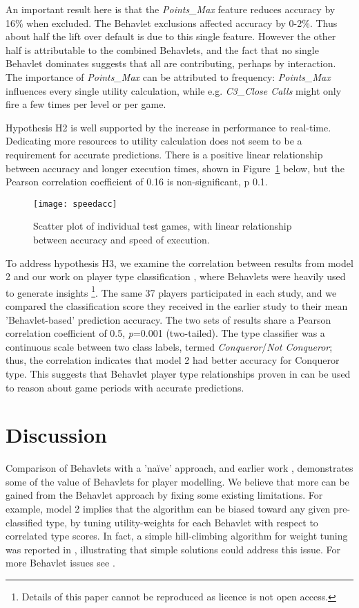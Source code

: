 \documentclass[conference]{IEEEtran}
\begin{document}
An important result here is that the \textit{Points\_Max} feature reduces accuracy by 16\% when excluded. The Behavlet exclusions affected accuracy by 0-2\%. Thus about half the lift over default is due to this single feature. However the other half is attributable to the combined Behavlets, and the fact that no single Behavlet dominates suggests that all are contributing, perhaps by interaction. The importance of \textit{Points\_Max} can be attributed to frequency: \textit{Points\_Max} influences every single utility calculation, while e.g. \textit{C3\_Close Calls} might only fire a few times per level or per game.

Hypothesis \textsf{H2} is well supported by the increase in performance to real-time. Dedicating more resources to utility calculation does not seem to be a requirement for accurate predictions. There is a positive linear relationship between accuracy and longer execution times, shown in Figure~\ref{fig.speedacc} below, but the Pearson correlation coefficient of 0.16 is non-significant, p  0.1.


\begin{figure}[!ht]
	\centering
	\texttt{[image: speedacc]}
	\caption{Scatter plot of individual test games, with linear relationship between accuracy and speed of execution.}
	\label{fig.speedacc}
\end{figure}

To address hypothesis \textsf{H3}, we examine the correlation between results from model 2 and our work on player type classification \cite{Cowley2013}, where Behavlets were heavily used to generate insights \footnote{Details of this paper cannot be reproduced as licence is not open access.}. The same 37 players participated in each study, and we compared the classification score they received in the earlier study to their mean 'Behavlet-based' prediction accuracy. The two sets of results share a Pearson correlation coefficient of 0.5, \textit{p}=0.001 (two-tailed). The type classifier was a continuous scale between two class labels, termed \textit{Conqueror}/\textit{Not Conqueror}; thus, the correlation indicates that model 2 had better accuracy for Conqueror type. This suggests that Behavlet player type relationships proven in \cite{Cowley2013} can be used to reason about game periods with accurate predictions.


\section{Discussion}
\label{disc}
Comparison of Behavlets with a 'na{\"i}ve' approach, and earlier work \cite{Cowley2013}, demonstrates some of the value of Behavlets for player modelling. We believe that more can be gained from the Behavlet approach by fixing some existing limitations. For example, model 2 implies that the algorithm can be biased toward any given pre-classified type, by tuning utility-weights for each Behavlet with respect to correlated type scores. In fact, a simple hill-climbing algorithm for weight tuning was reported in \cite{Cowley2009a}, illustrating that simple solutions could address this issue. For more Behavlet issues see \cite{Cowley2016behavlet}.
\end{document}
